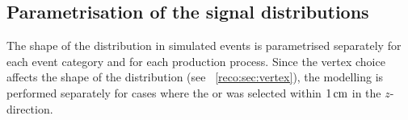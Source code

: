 \subsection{Parametrisation of the signal \mgg distributions}
\label{model:sec:signal_model_parametrisation}

The shape of the \mgg distribution in simulated \Hgg events is parametrised separately for each event category and for each production process. %
Since the vertex choice affects the shape of the \mgg distribution (see \Sec~\ref{reco:sec:vertex}), the modelling is performed separately for cases where the \RV or \WV was selected within $1\,\text{cm}$ in the $z$-direction.

